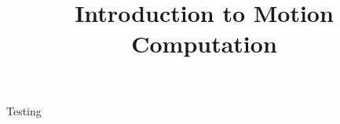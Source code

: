 \documentclass{beamer}
\title{Introduction to Motion Computation}
\begin{document}
\maketitle
\begin{frame}{Testing}

\end{frame}
\end{document}
